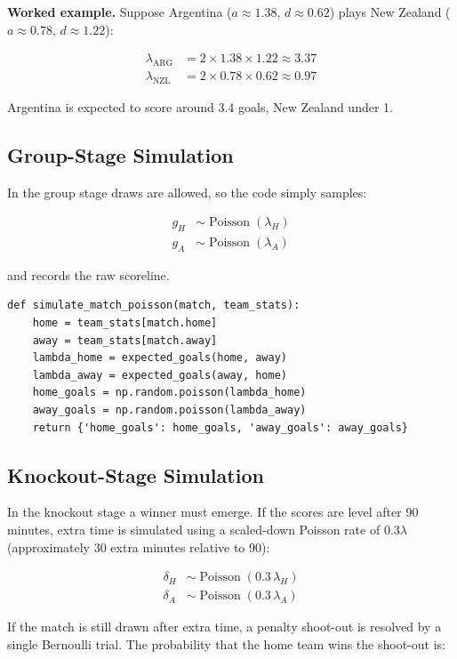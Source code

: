 \documentclass[12pt,a4paper]{article}
\newcommand{\Poi}{\operatorname{Poisson}}
\begin{document}
\textbf{Worked example.}  Suppose Argentina ($a \approx 1.38$,
$d \approx 0.62$) plays New Zealand ($a \approx 0.78$, $d \approx 1.22$):

\begin{align*}
  \lambda_{\text{ARG}} &= 2 \times 1.38 \times 1.22 \approx 3.37\\
  \lambda_{\text{NZL}} &= 2 \times 0.78 \times 0.62 \approx 0.97
\end{align*}

Argentina is expected to score around 3.4 goals, New Zealand under 1.

\subsection{Group-Stage Simulation}

In the group stage draws are allowed, so the code simply samples:

\begin{align*}
  g_H &\sim \Poi(\lambda_H)\\
  g_A &\sim \Poi(\lambda_A)
\end{align*}

and records the raw scoreline.

\begin{lstlisting}
def simulate_match_poisson(match, team_stats):
    home = team_stats[match.home]
    away = team_stats[match.away]
    lambda_home = expected_goals(home, away)
    lambda_away = expected_goals(away, home)
    home_goals = np.random.poisson(lambda_home)
    away_goals = np.random.poisson(lambda_away)
    return {'home_goals': home_goals, 'away_goals': away_goals}
\end{lstlisting}

\subsection{Knockout-Stage Simulation}

In the knockout stage a winner must emerge.  If the scores are level
after 90 minutes, extra time is simulated using a scaled-down Poisson
rate of $0.3\lambda$ (approximately 30 extra minutes relative to 90):

\begin{align}
  \delta_H &\sim \Poi(0.3 \, \lambda_H)\\
  \delta_A &\sim \Poi(0.3 \, \lambda_A)
\end{align}

If the match is still drawn after extra time, a penalty shoot-out is
resolved by a single Bernoulli trial.  The probability that the home
team wins the shoot-out is:
\end{document}

